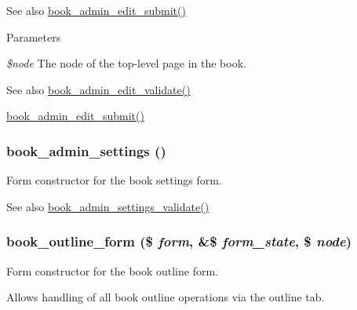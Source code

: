 \begin{DoxySeeAlso}{See also}
\hyperlink{book_8admin_8inc_af0fb9b52db15bf3bc44c63d5b9042c69}{book\_\-admin\_\-edit\_\-submit()}
\end{DoxySeeAlso}

\begin{DoxyParams}{Parameters}
\item[{\em \$node}]The node of the top-\/level page in the book.\end{DoxyParams}
\begin{DoxySeeAlso}{See also}
\hyperlink{book_8admin_8inc_ae92ff3db1b9b0f3a9832e1db72d5faec}{book\_\-admin\_\-edit\_\-validate()} 

\hyperlink{book_8admin_8inc_af0fb9b52db15bf3bc44c63d5b9042c69}{book\_\-admin\_\-edit\_\-submit()} 
\end{DoxySeeAlso}
\hypertarget{group__forms_ga036f1d2ed17d79b71545c955c864cf2e}{
\subsubsection[{book\_\-admin\_\-settings}]{\setlength{\rightskip}{0pt plus 5cm}book\_\-admin\_\-settings ()}}
\label{group__forms_ga036f1d2ed17d79b71545c955c864cf2e}
Form constructor for the book settings form.

\begin{DoxySeeAlso}{See also}
\hyperlink{book_8admin_8inc_a18c68be0c946b1fdf59bed35fc266d60}{book\_\-admin\_\-settings\_\-validate()} 
\end{DoxySeeAlso}
\hypertarget{group__forms_ga4903d29a89909f072c1aab2f8d718bdb}{
\subsubsection[{book\_\-outline\_\-form}]{\setlength{\rightskip}{0pt plus 5cm}book\_\-outline\_\-form (\$ {\em form}, \/  \&\$ {\em form\_\-state}, \/  \$ {\em node})}}
\label{group__forms_ga4903d29a89909f072c1aab2f8d718bdb}
Form constructor for the book outline form.

Allows handling of all book outline operations via the outline tab.



